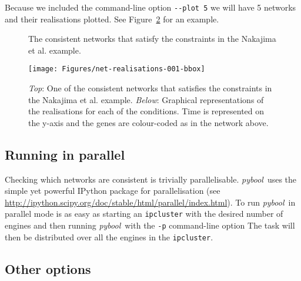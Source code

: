 \documentclass{article}
\newcommand{\pybool}{\emph{pybool}}
\begin{document}
Because we included the command-line option \verb!--plot 5! we will have 5 networks and their realisations plotted. See Figure~\ref{fig:network} for an example.

\begin{figure}[!tpb]
\center

\caption{The consistent networks that satisfy the constraints in the Nakajima et al. example.}
\label{fig:consistent}
\end{figure}


\begin{figure}[!tpb]
\center

\vspace{.5cm}
\texttt{[image: Figures/net-realisations-001-bbox]}
\caption{\emph{Top}: One of the consistent networks that satisfies the constraints in the Nakajima et al. example. \emph{Below}: Graphical representations of the realisations for each of the conditions. Time is represented on the y-axis and the genes are colour-coded as in the network above.}
\label{fig:network}
\end{figure}



\subsection{Running in parallel}

Checking which networks are consistent is trivially parallelisable. \pybool\ uses the simple yet powerful IPython package for parallelisation (see \url{http://ipython.scipy.org/doc/stable/html/parallel/index.html}). To run \pybool\ in parallel mode is as easy as starting an \verb!ipcluster! with the desired number of engines
and then running \pybool\ with the \verb!-p! command-line option
The task will then be distributed over all the engines in the \verb!ipcluster!.



\subsection{Other options}
\end{document}
